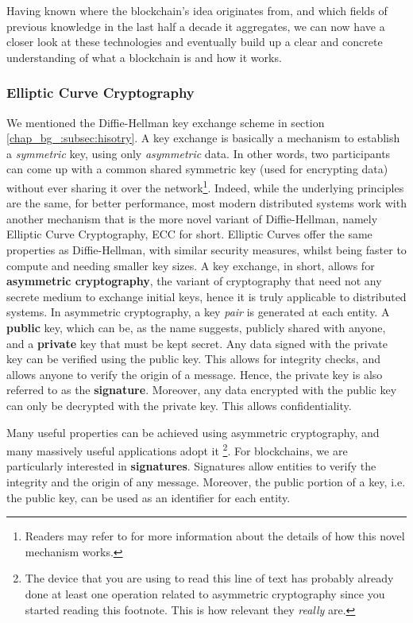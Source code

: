 Having known where the blockchain's idea originates from, and which fields of previous knowledge in
the last half a decade it aggregates, we can now have a closer look at these technologies and
eventually build up a clear and concrete understanding of what a blockchain is and how it works.

\subsubsection{Elliptic Curve Cryptography} \label{chap_bg:subsec:ecc}

We mentioned the Diffie-Hellman key exchange scheme in section \ref{chap_bg_:subsec:hisotry}. A key
exchange is basically a mechanism to establish a \textit{symmetric} key, using only
\textit{asymmetric} data. In other words, two participants can come up with a common shared
symmetric key (used for encrypting data) without ever sharing it over the network\footnote{Readers
may refer to \cite{Diffie_Hellman_1976} for more information about the details of how this novel
mechanism works.}. Indeed, while the underlying principles are the same, for better performance,
most modern distributed systems work with another mechanism that is the more novel variant of
Diffie-Hellman, namely Elliptic Curve Cryptography, ECC for short. Elliptic Curves offer the same
properties as Diffie-Hellman, with similar security measures, whilst being faster to compute and
needing smaller key sizes. A key exchange, in short, allows for \textbf{asymmetric cryptography},
the variant of cryptography that need not any secrete medium to exchange initial keys, hence
it is truly applicable to distributed systems. In asymmetric cryptography, a key \textit{pair} is
generated at each entity. A \textbf{public} key, which can be, as the name suggests, publicly shared
with anyone, and a \textbf{private} key that must be kept secret. Any data signed with the private
key can be verified using the public key. This allows for integrity checks, and allows anyone to
verify the origin of a message. Hence, the private key is also referred to as the
\textbf{signature}. Moreover, any data encrypted with the public key can only be decrypted with the
private key. This allows confidentiality.

Many useful properties can be achieved using asymmetric cryptography, and many massively useful
applications adopt it \footnote{The device that you are using to read this line of text has probably
already done at least one operation related to asymmetric cryptography since you started reading
this footnote. This is how relevant they \textit{really} are.}. For blockchains, we are particularly
interested in \textbf{signatures}. Signatures allow entities to verify the integrity and the origin
of any message. Moreover, the public portion of a key, i.e. the public key, can be used as an
identifier for each entity.

